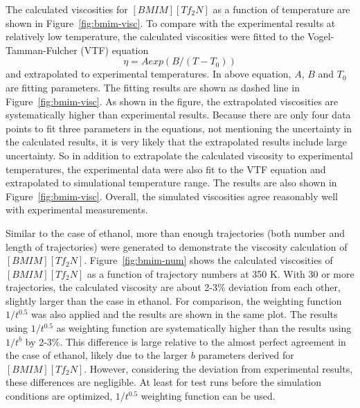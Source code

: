\documentclass[12pt]{article}
\begin{document}
The calculated viscosities for $[BMIM][Tf_2N]$ as a function of temperature are shown in Figure~\ref{fig:bmim-visc}.
To compare with the experimental results at relatively low temperature,
the calculated viscosities were fitted to
the Vogel-Tamman-Fulcher (VTF) equation
\cite{VTF}
\begin{equation}
{\eta = A exp(B/(T-T_0))  }
\label{eq:VTF}
\end{equation}
and extrapolated to experimental temperatures.
In above equation,
$A$, $B$ and $T_0$ are fitting parameters.
The fitting results are shown as dashed line in Figure~\ref{fig:bmim-visc}.
As shown in the figure,
the extrapolated viscosities are systematically higher than experimental results.
\cite{Gadzuric.JCED.57.1072.2012,
Katsuta.JCED.55.1588.2010,
Watanabe.JPCB.110.19593.2006,
Majer.GC.8.172.2006,
Watanabe.JPCB.109.6103.2005,
VanderNoot.JEC.568.167.2004}
Because there are only four data points to fit three parameters in the equations,
not mentioning the uncertainty in the calculated results,
it is very likely that the extrapolated results include large uncertainty.
So in addition to extrapolate the calculated viscosity to experimental temperatures,
the experimental data were also fit to the VTF equation 
and extrapolated to simulational temperature range.
The results are also shown in Figure~\ref{fig:bmim-visc}.
Overall, the simulated viscosities agree reasonably well with experimental measurements.

Similar to the case of ethanol,
more than enough trajectories (both number and length of trajectories) were generated
to demonstrate the viscosity calculation of $[BMIM][Tf_2N]$.
Figure~\ref{fig:bmim-num} shows the calculated viscosities of $[BMIM][Tf_2N]$ as a function of trajectory numbers at 350 K.
With 30 or more trajectories,
the calculated viscosity are about 2-3\% deviation from each other,
slightly larger than the case in ethanol.
For comparison,
the weighting function $1/t^{0.5}$ was also applied and the results are shown in the same plot.
The results using $1/t^{0.5}$ as weighting function are systematically higher than the results using $1/t^b$ by 2-3\%.
This difference is large relative to the almost perfect agreement in the case of ethanol,
likely due to the larger $b$ parameters derived for $[BMIM][Tf_2N]$.
However, considering the deviation from experimental results,
these differences are negligible.
At least for test runs before the simulation conditions are optimized,
$1/t^{0.5}$ weighting function can be used.
\end{document}
